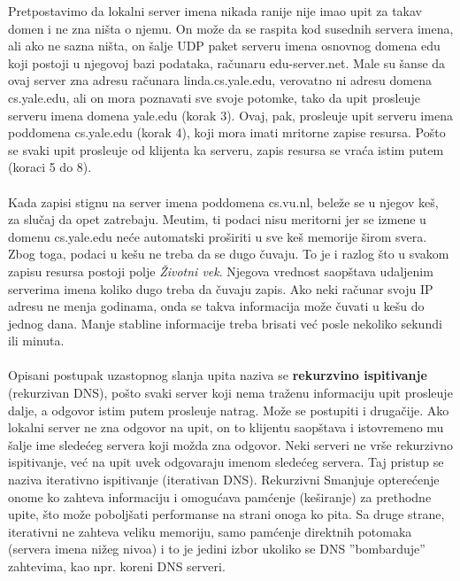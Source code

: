 \documentclass{article} %
\begin{document}
\noindent Pretpostavimo da lokalni server imena nikada ranije nije imao upit za takav domen i ne zna ni\v sta o njemu. On mo\v ze da se raspita kod susednih servera imena, ali ako ne sazna ni\v sta, on \v salje UDP paket serveru imena osnovnog domena edu koji postoji u njegovoj bazi podataka, ra\v cunaru edu-server.net. Male su \v sanse da ovaj server zna adresu ra\v cunara linda.cs.yale.edu, verovatno ni adresu domena cs.yale.edu, ali on mora poznavati sve svoje potomke, tako da upit prosle\dj uje serveru imena domena yale.edu (korak 3). Ovaj, pak, prosle\dj uje upit serveru imena poddomena cs.yale.edu (korak 4), koji mora imati mritorne zapise resursa. Po\v sto se svaki upit prosle\dj uje od klijenta ka serveru, zapis resursa se vra\' ca istim putem (koraci 5 do 8).
\\
\\ Kada zapisi stignu na server imena poddomena cs.vu.nl, bele\v ze se u njegov ke\v s, za slu\v caj da opet zatrebaju. Me\dj utim, ti podaci nisu meritorni jer se izmene u domenu cs.yale.edu ne\' ce automatski pro\v siriti u sve ke\v s memorije \v sirom svera. Zbog toga, podaci u ke\v su ne treba da se dugo \v cuvaju. To je i razlog \v sto u svakom zapisu resursa postoji polje \textit{\v Zivotni vek}. Njegova vrednost saop\v stava udaljenim serverima imena koliko dugo treba da \v cuvaju zapis. Ako neki ra\v cunar svoju IP adresu ne menja godinama, onda se takva informacija mo\v ze \v cuvati u ke\v su do jednog dana. Manje stabline informacije treba brisati ve\' c posle nekoliko sekundi ili minuta.
\\
\\ Opisani postupak uzastopnog slanja upita naziva se \textbf{rekurzvino ispitivanje} (rekurzivan DNS),  po\v sto svaki server koji nema tra\v zenu informaciju upit prosle\dj uje dalje, a odgovor istim putem prosle\dj uje natrag. Mo\v ze se postupiti i druga\v cije. Ako lokalni server ne zna odgovor na upit, on to klijentu saop\v stava i istovremeno mu \v salje ime slede\' ceg servera koji mo\v zda zna odgovor. Neki serveri ne vr\v se rekurzivno ispitivanje, ve\' c na upit uvek odgovaraju imenom slede\' ceg servera. Taj pristup se naziva iterativno ispitivanje (iterativan DNS). Rekurzivni Smanjuje optere\' cenje onome ko zahteva informaciju i omogu\' cava pam\' cenje (ke\v siranje) za prethodne upite, \v sto mo\v ze pobolj\v sati performanse na strani onoga ko pita. Sa druge strane, iterativni ne zahteva veliku memoriju, samo pam\' cenje direktnih potomaka (servera imena ni\v zeg nivoa) i to je jedini izbor ukoliko se DNS ''bombarduje'' zahtevima, kao npr. koreni DNS serveri.
\end{document}
